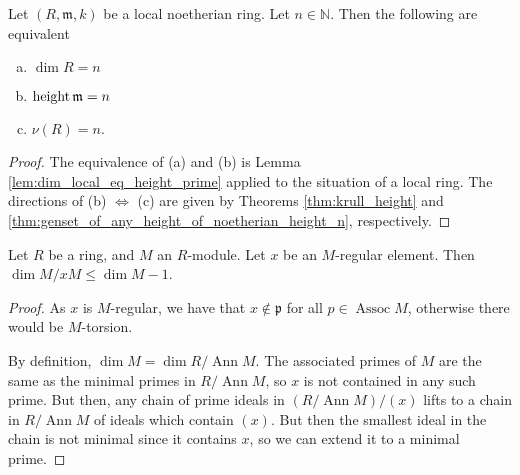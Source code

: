 \begin{theorem}
    \label{thm:dimension_theorem}
    Let \((R,\mathfrak{m},k)\) be a local noetherian ring.
    Let \(n \in \mathbb{N}\).
    Then the following are equivalent
    \begin{enumerate}[(a)]
        \item \(\dim R = n\)
        \item \(\operatorname{height} \mathfrak{m} = n\)
        \item \(\nu(R) = n\).
    \end{enumerate}
\end{theorem}

\begin{proof}
    The equivalence of (a) and (b) is
    Lemma \ref{lem:dim_local_eq_height_prime}
    applied to the situation of a local ring.
    The directions of (b) \(\iff\) (c) are given
    by Theorems \ref{thm:krull_height} and
    \ref{thm:genset_of_any_height_of_noetherian_height_n},
    respectively.
\end{proof}


%

\newcommand{\Assoc}{\operatorname{Assoc}}
\newcommand{\Ann}{\operatorname{Ann}}

\begin{theorem}
    \label{thm:quotient_regular_sub_dim_1}
    Let \(R\) be a ring, and \(M\) an \(R\)-module.
    Let \(x\) be an \(M\)-regular element.
    Then \(\dim M / xM \leq \dim M - 1\).
\end{theorem}

\begin{proof}
    As \(x\) is \(M\)-regular, we have that
    \(x \notin \mathfrak{p}\) for all
    \(p \in  \Assoc M\),
    otherwise there would be \(M\)-torsion.
    
    By definition, \(\dim M = \dim R / \Ann M\).
    The associated primes of \(M\) are the same
    as the minimal primes in \(R / \Ann M\),
    so \(x\) is not contained in any such prime.
    But then, any chain of prime ideals in 
    \((R / \Ann M) / (x)\) lifts to a chain in
    \(R / \Ann M\) of ideals which contain \((x)\).
    But then the smallest ideal in the chain 
    is not minimal since it contains \(x\), so
    we can extend it to a minimal prime.
\end{proof}

